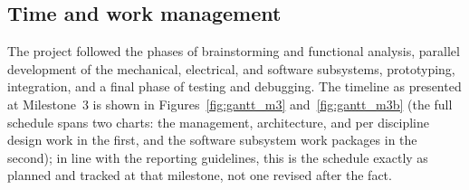 \documentclass[11pt]{article}
\begin{document}
\subsection{Time and work management}
The project followed the phases of brainstorming and functional analysis, parallel development of the mechanical, electrical, and software subsystems, prototyping, integration, and a final phase of testing and debugging. The timeline as presented at Milestone~3 is shown in Figures~\ref{fig:gantt_m3} and~\ref{fig:gantt_m3b} (the full schedule spans two charts: the management, architecture, and per discipline design work in the first, and the software subsystem work packages in the second); in line with the reporting guidelines, this is the schedule exactly as planned and tracked at that milestone, not one revised after the fact.
\end{document}
